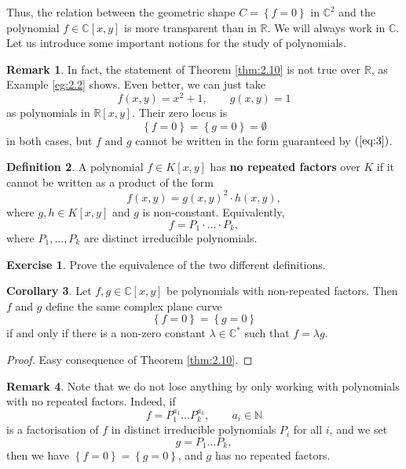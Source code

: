 \documentclass{article}
\newcommand{\N}{\mathbb{N}}
\newcommand{\R}{\mathbb{R}}
\newcommand{\C}{\mathbb{C}}
\newcommand{\rb}[1]{\left( #1 \right)}
\renewcommand{\sb}[1]{\left[ #1 \right]}
\newcommand{\cb}[1]{\left\{ #1 \right\}}
\theoremstyle{definition}\newtheorem{definition}{Definition}[section]
\theoremstyle{definition}\newtheorem{notation}[definition]{Notation}
\theoremstyle{definition}\newtheorem{remark}[definition]{Remark}
\theoremstyle{definition}\newtheorem{example1}[definition]{Example}
\theoremstyle{definition}\newtheorem{fact}{Fact}
\theoremstyle{definition}\newtheorem{exercise}{Exercise}
\theoremstyle{definition}\newtheorem*{example2}{Example}
\newtheorem{corollary}[definition]{Corollary}
\begin{document}
Thus, the relation between the geometric shape $ C = \cb{f = 0} $ in $ \C^2 $ and the polynomial $ f \in \C\sb{x, y} $ is more transparent than in $ \R $. We will always work in $ \C $. Let us introduce some important notions for the study of polynomials.

\begin{remark}
In fact, the statement of Theorem \ref{thm:2.10} is not true over $ \R $, as Example \ref{eg:2.2} shows. Even better, we can just take
$$ f\rb{x, y} = x^2 + 1, \qquad g\rb{x, y} = 1 $$
as polynomials in $ \R\sb{x, y} $. Their zero locus is
$$ \cb{f = 0} = \cb{g = 0} = \emptyset $$
in both cases, but $ f $ and $ g $ cannot be written in the form guaranteed by $ \rb{\ref{eq:3}} $.
\end{remark}

\begin{definition}
A polynomial $ f \in K\sb{x, y} $ has \textbf{no repeated factors} over $ K $ if it cannot be written as a product of the form
$$ f\rb{x, y} = g\rb{x, y}^2 \cdot h\rb{x, y}, $$
where $ g, h \in K\sb{x, y} $ and $ g $ is non-constant. Equivalently,
$$ f = P_1 \cdot \dots \cdot P_k, $$
where $ P_1, \dots, P_k $ are distinct irreducible polynomials.
\end{definition}

\begin{exercise}
Prove the equivalence of the two different definitions.
\end{exercise}

\begin{corollary}
Let $ f, g \in \C\sb{x, y} $ be polynomials with non-repeated factors. Then $ f $ and $ g $ define the same complex plane curve
$$ \cb{f = 0} = \cb{g = 0} $$
if and only if there is a non-zero constant $ \lambda \in \C^* $ such that $ f = \lambda g $.
\end{corollary}

\begin{proof}
Easy consequence of Theorem \ref{thm:2.10}.
\end{proof}

\begin{remark}
Note that we do not lose anything by only working with polynomials with no repeated factors. Indeed, if
$$ f = P_1^{a_1} \dots P_k^{a_k}, \qquad a_i \in \N $$
is a factorisation of $ f $ in distinct irreducible polynomials $ P_i $ for all $ i $, and we set
$$ g = P_1 \dots P_k, $$
then we have $ \cb{f = 0} = \cb{g = 0} $, and $ g $ has no repeated factors.
\end{remark}
\end{document}
